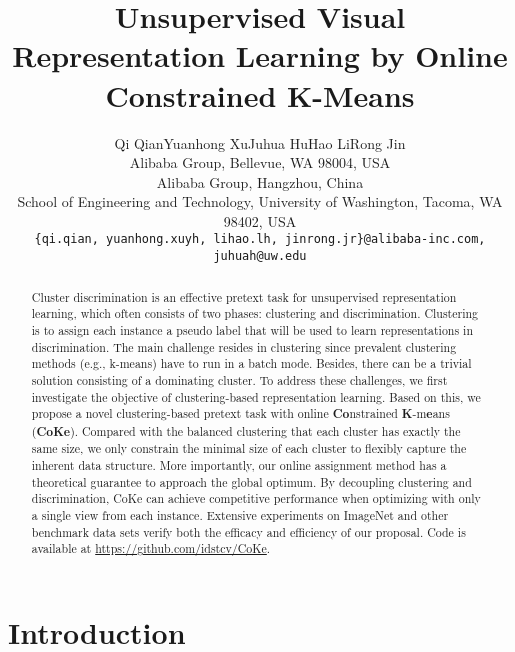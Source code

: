 \documentclass[10pt,twocolumn,letterpaper]{article}
\begin{document}
\title{Unsupervised Visual Representation Learning by Online Constrained K-Means}

\author{Qi Qian\quad Yuanhong Xu\quad Juhua Hu\quad Hao Li\quad Rong Jin\\
Alibaba Group, Bellevue, WA 98004, USA\\
Alibaba Group, Hangzhou, China\\
School of Engineering and Technology, University of Washington, Tacoma, WA 98402, USA\\
{\tt\small \{qi.qian, yuanhong.xuyh, lihao.lh, jinrong.jr\}@alibaba-inc.com, juhuah@uw.edu}
}

\maketitle

\begin{abstract}
Cluster discrimination is an effective pretext task for unsupervised representation learning, which often consists of two phases: clustering and discrimination. Clustering is to assign each instance a pseudo label that will be used to learn representations in discrimination. The main challenge resides in clustering since prevalent clustering methods (e.g., k-means) have to run in a batch mode. Besides, there can be a trivial solution consisting of a dominating cluster. To address these challenges, we first investigate the objective of clustering-based representation learning. Based on this, we propose a novel clustering-based pretext task with online \textbf{Co}nstrained \textbf{K}-m\textbf{e}ans (\textbf{CoKe}). Compared with the balanced clustering that each cluster has exactly the same size, we only constrain the minimal size of each cluster to flexibly capture the inherent data structure. More importantly, our online assignment method has a theoretical guarantee to approach the global optimum. By decoupling clustering and discrimination, CoKe can achieve competitive performance when optimizing with only a single view from each instance. Extensive experiments on ImageNet and other benchmark data sets verify both the efficacy and efficiency of our proposal. Code is available at \url{https://github.com/idstcv/CoKe}.
\end{abstract}

\section{Introduction}
\end{document}
